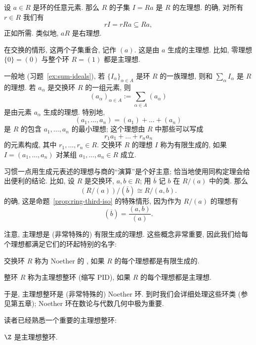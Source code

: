设 $a \in R$ 是环的任意元素. 那么 $R$ 的子集 $I = Ra$ 是 $R$ 的左理想. 的确, 对所有 $r \in R$ 我们有
\[
rI = rRa \subseteq Ra,
\]
正如所需. 类似地, $aR$ 是右理想.

在交换的情形, 这两个子集重合, 记作 $(a)$. 这是由 $a$ 生成的主理想. 比如, 零理想 $\{0\} = (0)$ 与整个环 $R = (1)$ 都是主理想.

一般地 (习题~\ref{ex:sum-ideals}), 若 $\{I_{\alpha}\}_{\alpha \in A}$ 是环 $R$ 的一族理想, 则和 $\sum_{\alpha} I_{\alpha}$ 是 $R$ 的理想. 若 $a_{\alpha}$ 是交换环 $R$ 的一组元素, 则
\[
(a_{\alpha})_{\alpha \in A} := \sum_{\alpha \in A} (a_{\alpha})
\]
是由元素 $a_{\alpha}$ 生成的理想. 特别地,
\[
(a_1, \dots, a_n) = (a_1) + \dots + (a_n)
\]
是 $R$ 的包含 $a_1, \ldots, a_n$ 的最小理想; 这个理想由 $R$ 中那些可以写成
\[
r_1 a_1 + \dots + r_n a_n
\]
的元素构成, 其中 $r_1, \ldots, r_n \in R$. 交换环 $R$ 的理想 $I$ 称为有限生成的, 如果 $I = (a_1, \ldots, a_n)$ 对某组 $a_1, \ldots, a_n \in R$ 成立.

\begin{example}
\label{ex:ideal-calculus}
习惯一点用生成元表述的理想与商的``演算''是个好主意; 恰当地使用同构定理会给出便利的结论. 比如, 设 $R$ 是交换环, $a, b \in R$; 用 $\overline{b}$ 记 $b$ 在 $R/(a)$ 中的类. 那么
\[
(R/(a))/(\overline{b}) \cong R/(a, b).
\]
的确, 这是命题~\ref{prop:ring-third-iso} 的特殊情形, 因为作为 $R/(a)$ 的理想有
\[
(\overline{b}) = \frac{(a, b)}{(a)}.
\]
\end{example}

注意, 主理想是 (非常特殊的) 有限生成的理想. 这些概念非常重要, 因此我们给每个理想都满足它们的环起特别的名字:

\begin{definition}
\label{def:noetherian}
交换环 $R$ 称为 Noether 的%
, 如果 $R$ 的每个理想都是有限生成的.
\end{definition}

\begin{definition}
\label{def:pid}
整环 $R$ 称为主理想整环 (缩写 PID), 如果 $R$ 的每个理想都是主理想.
\end{definition}

于是, 主理想整环是 (非常特殊的) Noether 环. 到时我们会详细处理这些环类 (参见第五章); Noether 环在数论与代数几何中极为重要.

读者已经熟悉一个重要的主理想整环:

\begin{proposition}
\label{prop:Z-PID}
$\Z$ 是主理想整环.
\end{proposition}

